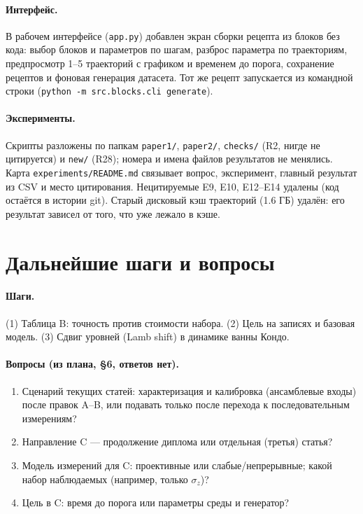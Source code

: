 \documentclass[12pt,a4paper]{article}
\begin{document}
\paragraph{Интерфейс.} В рабочем интерфейсе (\texttt{app.py}) добавлен экран сборки рецепта из блоков
без кода: выбор блоков и параметров по шагам, разброс параметра по траекториям, предпросмотр 1--5
траекторий с графиком и временем до порога, сохранение рецептов и фоновая генерация датасета. Тот же
рецепт запускается из командной строки (\texttt{python -m src.blocks.cli generate}).

\paragraph{Эксперименты.} Скрипты разложены по папкам \texttt{paper1/}, \texttt{paper2/},
\texttt{checks/} (R2, нигде не цитируется) и \texttt{new/} (R28); номера и имена файлов результатов не
менялись. Карта \texttt{experiments/README.md} связывает вопрос, эксперимент, главный результат из CSV и
место цитирования. Нецитируемые E9, E10, E12--E14 удалены (код остаётся в истории git). Старый
дисковый кэш траекторий (1.6 ГБ) удалён: его результат зависел от того, что уже лежало в кэше.

\section{Дальнейшие шаги и вопросы}

\paragraph{Шаги.} (1) Таблица B: точность против стоимости набора. (2) Цель на записях и базовая модель.
(3) Сдвиг уровней (Lamb shift) в динамике ванны Кондо.

\paragraph{Вопросы (из плана, §6, ответов нет).}
\begin{enumerate}
\item Сценарий текущих статей: характеризация и калибровка (ансамблевые входы) после правок A--B, или
подавать только после перехода к последовательным измерениям?
\item Направление C --- продолжение диплома или отдельная (третья) статья?
\item Модель измерений для C: проективные или слабые/непрерывные; какой набор наблюдаемых (например, только $\sigma_z$)?
\item Цель в C: время до порога или параметры среды и генератор?
\end{enumerate}
\end{document}
